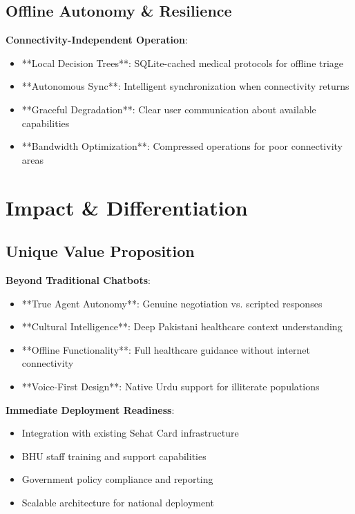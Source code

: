 \documentclass[11pt,a4paper]{article}
\begin{document}
\subsection{Offline Autonomy \& Resilience}

\textbf{Connectivity-Independent Operation}:
\begin{itemize}[leftmargin=*, itemsep=0pt]
    \item **Local Decision Trees**: SQLite-cached medical protocols for offline triage
    \item **Autonomous Sync**: Intelligent synchronization when connectivity returns
    \item **Graceful Degradation**: Clear user communication about available capabilities
    \item **Bandwidth Optimization**: Compressed operations for poor connectivity areas
\end{itemize}

\section{Impact \& Differentiation}

\subsection{Unique Value Proposition}

\textbf{Beyond Traditional Chatbots}:
\begin{itemize}[leftmargin=*, itemsep=0pt]
    \item **True Agent Autonomy**: Genuine negotiation vs. scripted responses
    \item **Cultural Intelligence**: Deep Pakistani healthcare context understanding
    \item **Offline Functionality**: Full healthcare guidance without internet connectivity
    \item **Voice-First Design**: Native Urdu support for illiterate populations
\end{itemize}

\textbf{Immediate Deployment Readiness}:
\begin{itemize}[leftmargin=*, itemsep=0pt]
    \item Integration with existing Sehat Card infrastructure
    \item BHU staff training and support capabilities
    \item Government policy compliance and reporting
    \item Scalable architecture for national deployment
\end{itemize}
\end{document}
